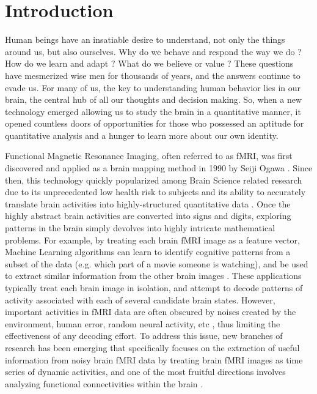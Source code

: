 \documentclass[11pt]{article}
\begin{document}
\section{Introduction}
Human beings have an insatiable desire to understand, not only the things around us, but also ourselves. Why do we behave and respond the way we do \cite{hasson2012}? How do we learn and adapt \cite{hasson2004}\cite{hasson2005}? What do we believe or value \cite{Greene01}? These questions have mesmerized wise men for thousands of years, and the answers continue to evade us. For many of us, the key to understanding human behavior lies in our brain, the central hub of all our thoughts and decision making. So, when a new technology emerged allowing us to study the brain in a quantitative manner, it opened countless doors of opportunities for those who possessed an aptitude for quantitative analysis and a hunger to learn more about our own identity.

Functional Magnetic Resonance Imaging, often referred to as fMRI, was first discovered and applied as a brain mapping method in 1990 by Seiji Ogawa \cite{Ogawa90}. Since then, this technology quickly popularized among Brain Science related research due to its unprecedented low health risk to subjects and its ability to accurately translate brain activities into highly-structured quantitative data \cite{Logothetis01}. Once the highly abstract brain activities are converted into signs and digits, exploring patterns in the brain simply devolves into highly intricate mathematical problems. For example, by treating each brain fMRI image as a feature vector, Machine Learning algorithms can learn to identify cognitive patterns from a subset of the data (e.g. which part of a movie someone is watching), and be used to extract similar information from the other brain images \cite{Norman06}\cite{peterson12}\cite{peterson17}. These applications typically treat each brain image in isolation, and attempt to decode patterns of activity associated with each of several candidate brain states. However, important activities in fMRI data are often obscured by noises created by the environment, human error, random neural activity, etc \cite{peterson11}, thus limiting the effectiveness of any decoding effort. To address this issue, new branches of research has been emerging that specifically focuses on the extraction of useful information from noisy brain fMRI data by treating brain fMRI images as time series of dynamic activities, and one of the most fruitful directions involves analyzing functional connectivities within the brain \cite{peterson9} \cite{peterson19} \cite{peterson20}.
\end{document}
